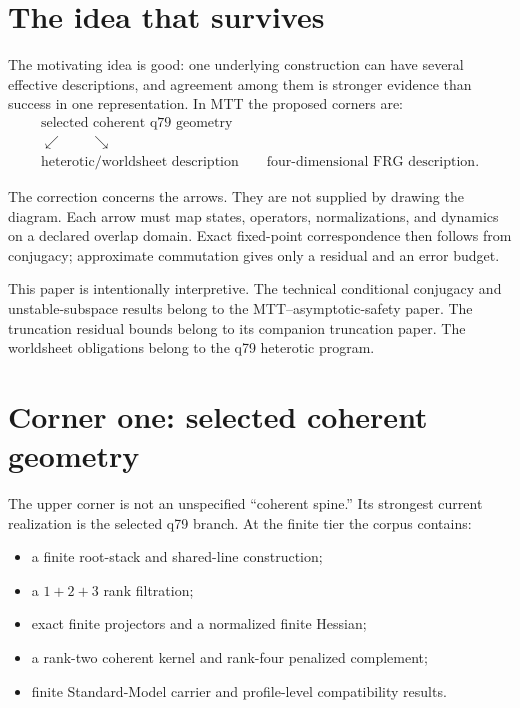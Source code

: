 \documentclass[11pt]{article}
\begin{document}
\tableofcontents

\section{The idea that survives}

The motivating idea is good: one underlying construction can have several
effective descriptions, and agreement among them is stronger evidence than
success in one representation. In MTT the proposed corners are:
\[
\begin{array}{c}
\text{selected coherent q79 geometry}\\[0.3em]
\swarrow\qquad\searrow\\[-0.2em]
\text{heterotic/worldsheet description}
\qquad
\text{four-dimensional FRG description}.
\end{array}
\]

The correction concerns the arrows. They are not supplied by drawing the
diagram. Each arrow must map states, operators, normalizations, and dynamics
on a declared overlap domain. Exact fixed-point correspondence then follows
from conjugacy; approximate commutation gives only a residual and an error
budget.

This paper is intentionally interpretive. The technical conditional
conjugacy and unstable-subspace results belong to the MTT--asymptotic-safety
paper. The truncation residual bounds belong to its companion truncation
paper. The worldsheet obligations belong to the q79 heterotic program.

\section{Corner one: selected coherent geometry}

The upper corner is not an unspecified ``coherent spine.'' Its strongest
current realization is the selected q79 branch. At the finite tier the corpus
contains:
\begin{itemize}
\item a finite root-stack and shared-line construction;
\item a \(1+2+3\) rank filtration;
\item exact finite projectors and a normalized finite Hessian;
\item a rank-two coherent kernel and rank-four penalized complement;
\item finite Standard-Model carrier and profile-level compatibility results.
\end{itemize}
\end{document}
